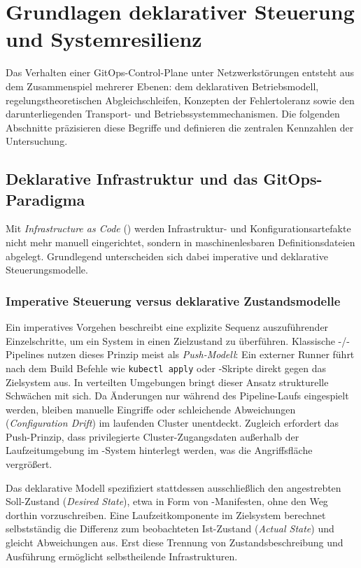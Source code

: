\chapter{Grundlagen deklarativer Steuerung und Systemresilienz}
\label{chap:theoretische-grundlagen}

Das Verhalten einer GitOps-Control-Plane unter Netzwerkstörungen entsteht aus dem Zusammenspiel mehrerer Ebenen: dem deklarativen Betriebsmodell, regelungstheoretischen Abgleichschleifen, Konzepten der Fehlertoleranz sowie den darunterliegenden Transport- und Betriebssystemmechanismen. Die folgenden Abschnitte präzisieren diese Begriffe und definieren die zentralen Kennzahlen der Untersuchung.

\section{Deklarative Infrastruktur und das GitOps-Paradigma}
\label{sec:deklarative-infrastruktur-gitops}

Mit \textit{Infrastructure as Code} () werden Infrastruktur- und Konfigurationsartefakte nicht mehr manuell eingerichtet, sondern in maschinenlesbaren Definitionsdateien abgelegt.\autocite[Kap.~2]{morris_iac_2020} Grundlegend unterscheiden sich dabei imperative und deklarative Steuerungsmodelle.

\subsection{Imperative Steuerung versus deklarative Zustandsmodelle}
\label{subsec:imperativ-vs-deklarativ}

Ein imperatives Vorgehen beschreibt eine explizite Sequenz auszuführender Einzelschritte, um ein System in einen Zielzustand zu überführen. Klassische -/-Pipelines nutzen dieses Prinzip meist als \textit{Push-Modell}: Ein externer Runner führt nach dem Build Befehle wie \texttt{kubectl apply} oder -Skripte direkt gegen das Zielsystem aus.\autocite{beetz_gitops_2022} In verteilten Umgebungen bringt dieser Ansatz strukturelle Schwächen mit sich. Da Änderungen nur während des Pipeline-Laufs eingespielt werden, bleiben manuelle Eingriffe oder schleichende Abweichungen (\textit{Configuration Drift}) im laufenden Cluster unentdeckt. Zugleich erfordert das Push-Prinzip, dass privilegierte Cluster-Zugangsdaten außerhalb der Laufzeitumgebung im -System hinterlegt werden, was die Angriffsfläche vergrößert.

Das deklarative Modell spezifiziert stattdessen ausschließlich den angestrebten Soll-Zustand (\textit{Desired State}), etwa in Form von -Manifesten, ohne den Weg dorthin vorzuschreiben.\autocite[Kap.~1]{burns_kubernetes_2022} Eine Laufzeitkomponente im Zielsystem berechnet selbstständig die Differenz zum beobachteten Ist-Zustand (\textit{Actual State}) und gleicht Abweichungen aus. Erst diese Trennung von Zustandsbeschreibung und Ausführung ermöglicht selbstheilende Infrastrukturen.\autocite{burns_borg_2016}

